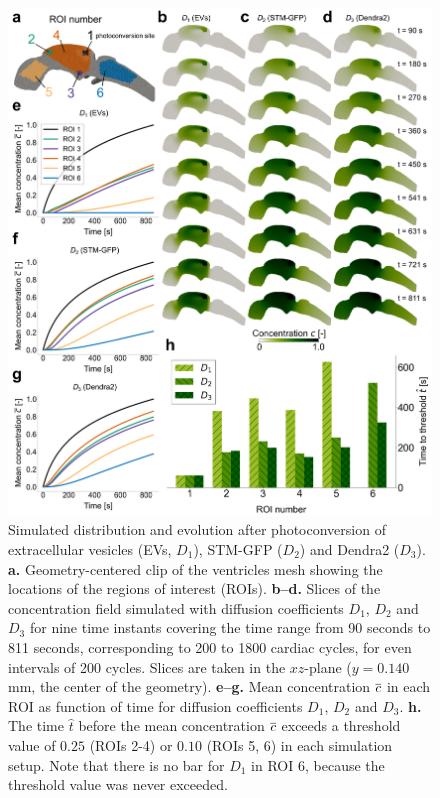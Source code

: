 \documentclass{WileyMSP-template}
\begin{document}
\begin{figure}%
    \centering
    \includegraphics[width=\textwidth]{graphics/figure2_simulation_results_different_coeffs.png}
    \caption{Simulated distribution and evolution after photoconversion of
    extracellular vesicles (EVs, $D_1$), STM-GFP ($D_2$) and Dendra2 ($D_3$). 
    \textbf{a.} Geometry-centered clip of the ventricles mesh showing the locations of the 
    regions of interest (ROIs).
    \textbf{b--d.} Slices of the concentration field simulated
    with diffusion coefficients $D_1$, $D_2$ and $D_3$ for nine time instants covering the
    time range from 90 seconds to 811 seconds, corresponding to 200 to 1800 cardiac cycles,
    for even intervals of 200 cycles.
    Slices are taken in the $xz$-plane ($y=0.140$ mm, the center of the geometry).
    \textbf{e--g.} Mean concentration $\overline{c}$ in each ROI
    as function of time for diffusion coefficients $D_1$, $D_2$ and $D_3$. 
    \textbf{h.} The time $\hat{t}$ before the mean concentration $\overline{c}$ exceeds a
    threshold value of $0.25$ (ROIs 2-4) or $0.10$ (ROIs 5, 6) in each simulation setup.
    Note that there is no bar for $D_1$ in ROI 6, because the threshold value was never exceeded.}
    \label{fig:fig2}
\end{figure}
\end{document}
